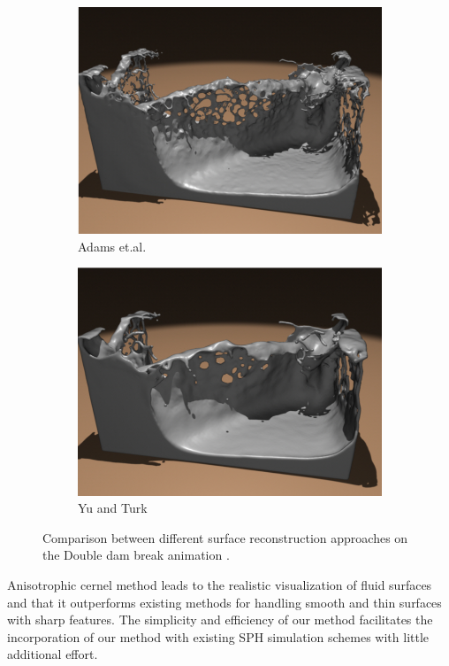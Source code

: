 \begin{figure}[H]
	\begin{center}
		\begin{subfigure}[b]{0.48\textwidth}
			\includegraphics[width=\textwidth]{figures/Adams.et.al.Reconstruction.png}
			\caption{Adams et.al.}
		\end{subfigure}
		\begin{subfigure}[b]{0.48\textwidth}
			\includegraphics[width=\textwidth]{figures/Ya_and_Turl.Reconstruction.png}
			\caption{Yu and Turk}
		\end{subfigure}
	\end{center}
	\caption{Comparison between different surface reconstruction approaches on the Double dam break animation \cite{YuTurk}.}
	\label{fig:Adams_vs_YoTurk}
\end{figure}
Anisotrophic cernel method leads to the realistic visualization of fluid surfaces and that it outperforms existing methods for handling smooth and thin surfaces with sharp features. The simplicity and efficiency of our method facilitates the incorporation of our method with existing SPH simulation schemes with little additional effort.


        
        
        

